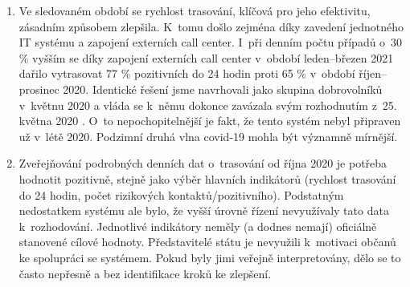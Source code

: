 \begin{enumerate}
\item Ve sledovaném období se rychlost trasování, klíčová pro jeho efektivitu, zá\-sad\-ním způsobem zlepšila. K~tomu došlo zejména díky zavedení jednotného IT sys\-té\-mu a zapojení externích call center. I~při denním počtu případů o~30 \% vyšším se díky zapojení externích call center v~období leden--březen 2021 dařilo vytrasovat 77 \% pozitivních do 24 hodin proti 65 \% v~období říjen--prosinec 2020. Identické řešení jsme navrhovali jako skupina dobrovolníků v~květnu 2020 \cite{tr_hlidac02} a vláda se k~němu dokonce zavázala svým rozhodnutím z~25. května 2020 \cite{tr_vlada01}. O~to nepochopitelnější je fakt, že tento systém nebyl připraven už v~létě 2020. Podzimní druhá vlna covid-19 mohla být významně mírnější.
\item Zveřejňování podrobných denních dat o~trasování od října 2020 je potřeba hodnotit pozitivně, stejně jako výběr hlavních indikátorů (rychlost trasování do 24 hodin, počet rizikových kontaktů/pozitivního). Podstatným nedostatkem systému ale bylo, že vyšší úrovně řízení nevyužívaly tato data k~rozhodování. Jednotlivé indikátory neměly (a dodnes nemají) oficiálně stanovené cílové hodnoty. Představitelé státu je nevyužili k~motivaci občanů ke spolupráci se systémem. Pokud byly jimi veřejně interpretovány, dělo se to často nepřesně a bez identifikace kroků ke zlepšení.


\end{enumerate}
